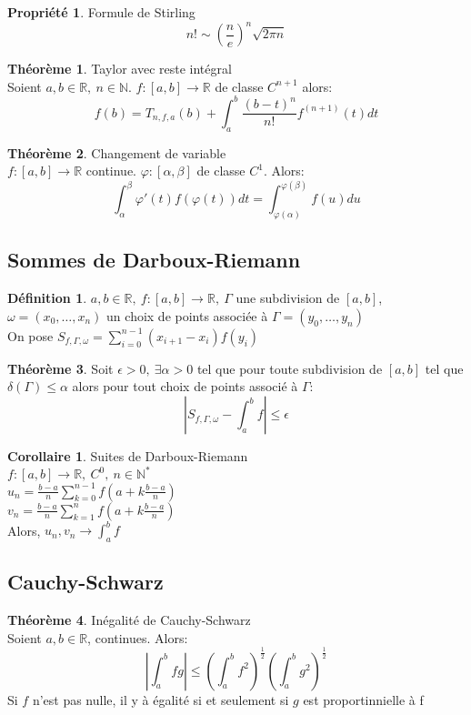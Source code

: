 \documentclass[fleqn]{article}
\theoremstyle{definition} \newtheorem*{defi}{D\'efinition}
\theoremstyle{definition} \newtheorem*{theo}{Th\'eor\`eme}
\theoremstyle{definition} \newtheorem*{coro}{Corollaire}
\theoremstyle{remark} \newtheorem*{rqs}{Remarques}
\theoremstyle{definition} \newtheorem*{prop}{Propri\'et\'e}
\begin{document}
\begin{prop} Formule de Stirling
	\[n! \sim (\frac{n}{e})^n \sqrt{2\pi n}\]
\end{prop}

\begin{theo} Taylor avec reste int\'egral \\
	Soient $a,b \in \mathbb{R},\ n \in \mathbb{N}$. $f:[a,b] \rightarrow \mathbb{R}$ de classe $C^{n+1}$ alors:
	\[f(b) = T_{n,f,a}(b) + \int_a^b \frac{(b-t)^n}{n!} f^{(n+1)} (t)dt\]
\end{theo}

\begin{theo} Changement de variable \\
	$f:[a,b] \rightarrow \mathbb{R}$ continue. $\varphi:[\alpha, \beta]$ de classe $C^1$. Alors:
	\[\int_\alpha^\beta \varphi '(t) f(\varphi(t)) dt = \int_{\varphi(\alpha)}^{\varphi(\beta)} f(u)du\]
\end{theo}

\subsection{Sommes de Darboux-Riemann}
\begin{defi}
	$a,b \in \mathbb{R},\ f:[a,b] \rightarrow \mathbb{R},\ \Gamma$ une subdivision de $[a,b]$, $\omega = (x_0, \hdots, x_n)$ un choix de
	points associ\'ee \`a $\Gamma = (y_0, \hdots, y_n)$ \\
	On pose $S_{f,\Gamma, \omega} = \sum_{i=0}^{n-1} (x_{i+1} - x_i) f(y_i)$
\end{defi}
\begin{theo}
	Soit $\epsilon > 0,\ \exists \alpha > 0$ tel que pour toute subdivision de $[a,b]$ tel que $\delta(\Gamma) \leq \alpha$ alors
	pour tout choix de points associ\'e \`a $\Gamma$:
	\[|S_{f,\Gamma, \omega} - \int_a^b f| \leq \epsilon\]
\end{theo}

\begin{coro} Suites de Darboux-Riemann \\
	$f:[a,b] \rightarrow \mathbb{R},\ C^0,\ n \in \mathbb{N}^*$ \\
	$u_n = \frac{b-a}{n} \sum_{k= 0}^{n-1} f(a + k\frac{b-a}{n})$ \\
	$v_n = \frac{b-a}{n} \sum_{k= 1}^{n} f(a + k\frac{b-a}{n})$ \\
	Alors, $u_n, v_n \rightarrow \int_a^b f$
\end{coro}

\subsection{Cauchy-Schwarz}
\begin{theo} In\'egalit\'e de Cauchy-Schwarz \\
	Soient $a,b \in \mathbb{R}$, continues. Alors:
	\[\left|\int_a^b fg\right| \leq \left(\int_a^b f^2\right)^\frac{1}{2} \left(\int_a^b g^2\right)^\frac{1}{2}\]
	Si $f$ n'est pas nulle, il y \`a \'egalit\'e si et seulement si $g$ est proportinnielle \`a f
\end{theo}
\end{document}

